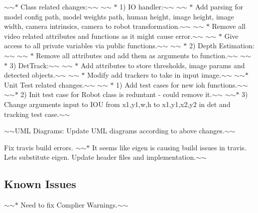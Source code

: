 $\sim$$\sim$$\ast$ Class related changes\+:$\sim$$\sim$ $\sim$$\sim$ $\ast$ 1) IO handler\+:$\sim$$\sim$ $\sim$$\sim$ $\ast$ Add parsing for model config path, model weights path, human height, image height, image width, camera intrinsics, camera to robot transformation.$\sim$$\sim$ $\sim$$\sim$ $\ast$ Remove all video related attributes and functions as it might cause error.$\sim$$\sim$ $\sim$$\sim$ $\ast$ Give access to all private variables via public functions.$\sim$$\sim$ $\sim$$\sim$ $\ast$ 2) Depth Estimation\+:$\sim$$\sim$ $\sim$$\sim$ $\ast$ Remove all attributes and add them as arguments to function.$\sim$$\sim$ $\sim$$\sim$ $\ast$ 3) Det\+Track\+:$\sim$$\sim$ $\sim$$\sim$ $\ast$ Add attributes to store thresholds, image params and detected objects.$\sim$$\sim$ $\sim$$\sim$ $\ast$ Modify add trackers to take in input image.$\sim$$\sim$ $\sim$$\sim$$\ast$ Unit Test related changes.$\sim$$\sim$ $\sim$$\sim$ $\ast$ 1) Add test cases for new ioh functions.$\sim$$\sim$ $\sim$$\sim$$\ast$ 2) Init test case for Robot class is reduntant -\/ could remove it.$\sim$$\sim$ $\sim$$\sim$$\ast$ 3) Change arguments input to I\+OU from x1,y1,w,h to x1,y1,x2,y2 in det and tracking test case.$\sim$$\sim$
\begin{DoxyItemize}
\item $\sim$$\sim$\+U\+ML Diagrams\+: Update U\+ML diagrams according to above changes.$\sim$$\sim$
\item Fix travis build errors. $\sim$$\sim$$\ast$ It seems like eigen is causing build issues in travis. Lets substitute eigen. Update header files and implementation.$\sim$$\sim$
\end{DoxyItemize}

\subsection*{Known Issues}

$\sim$$\sim$$\ast$ Need to fix Complier Warnings.$\sim$$\sim$ 